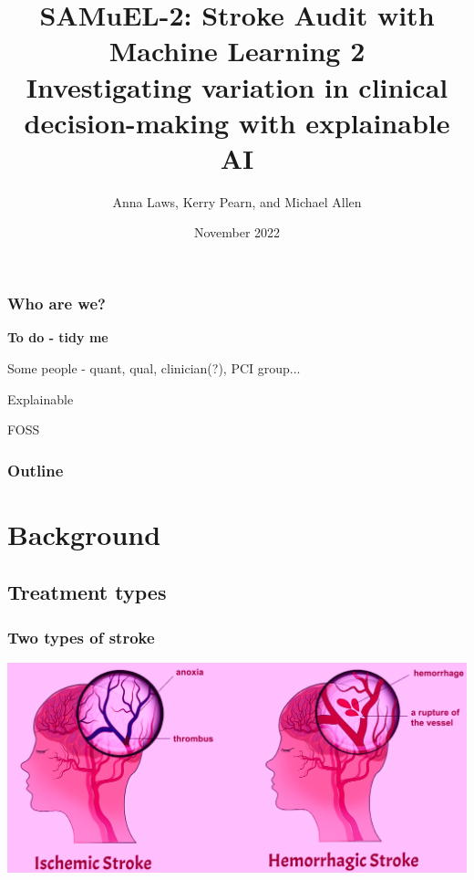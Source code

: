 \documentclass[xcolor={usenames,dvipsnames}]{beamer}
\title{SAMuEL-2: Stroke Audit with Machine Learning 2\\Investigating variation in clinical decision-making with explainable AI}
\author[Anna Laws]{Anna Laws, Kerry Pearn, and Michael Allen}
\institute{University of Exeter Medical School, PenCHORD}
\date{November 2022}%
\begin{document}
\frame{\titlepage}




\begin{frame}
\frametitle{Who are we?}


\textbf{To do - tidy me} 

Some people - quant, qual, clinician(?), PCI group... 

Explainable

FOSS 

\end{frame}



\begin{frame}
\frametitle{Outline}
\tableofcontents
\end{frame}


\section{Background}
\subsection{Treatment types} %




\begin{frame}
\frametitle{Two types of stroke}
\includegraphics[width=1.0\textwidth]{./images_pink/stroke_types}
\end{frame}
\end{document}
